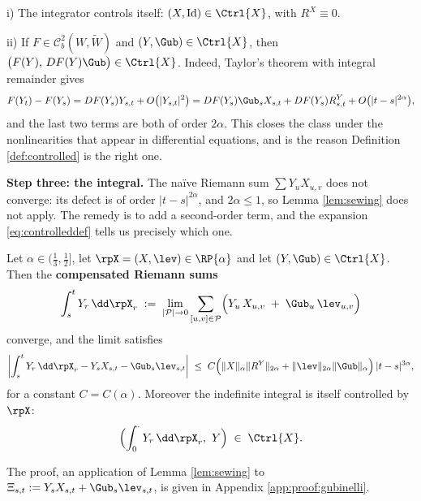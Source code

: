 \begin{example}\label{ex:controlledexamples}
i) The integrator controls itself: $(X, \mathrm{Id}) \in \Ctrl{X}$, with $R^X \equiv 0$.

ii) If $F \in \mathcal{C}^2_b(W,\widetilde W)$ and $(Y,\Gub) \in \Ctrl{X}$, then
$\bigl(F(Y),\,DF(Y)\Gub\bigr) \in \Ctrl{X}$. Indeed, Taylor's theorem with integral remainder gives
\[
F(Y_t)-F(Y_s) = DF(Y_s)Y_{s,t} + O\bigl(|Y_{s,t}|^2\bigr)
= DF(Y_s)\Gub_s X_{s,t} + DF(Y_s)R^Y_{s,t} + O\bigl(|t-s|^{2\alpha}\bigr),
\]
and the last two terms are both of order $2\alpha$. This closes the class under the nonlinearities
that appear in differential equations, and is the reason Definition \ref{def:controlled} is the
right one.
\end{example}

\medskip

\noindent\textbf{Step three: the integral.} The naïve Riemann sum $\sum Y_u X_{u,v}$ does not
converge: its defect is of order $|t-s|^{2\alpha}$, and $2\alpha \leq 1$, so Lemma \ref{lem:sewing}
does not apply. The remedy is to add a second-order term, and the expansion \eqref{eq:controlleddef}
tells us precisely which one.

\begin{theorem}[Gubinelli]\label{thm:gubinelli}
Let $\alpha \in (\tfrac13,\tfrac12]$, let $\rpX = (X,\lev)\in\RP{\alpha}$ and let
$(Y,\Gub) \in \Ctrl{X}$. Then the \textbf{compensated Riemann sums}
\begin{equation}\label{eq:roughintegral}
\int_s^t Y_r\,\dd\rpX_r \;:=\; \lim_{|\mathcal{P}|\to0} \sum_{[u,v]\in\mathcal{P}} \Bigl( Y_u\,X_{u,v} \;+\; \Gub_u\,\lev_{u,v} \Bigr)
\end{equation}
converge, and the limit satisfies
\begin{equation}\label{eq:roughintegralestimate}
\biggl| \int_s^t Y_r\,\dd\rpX_r - Y_s X_{s,t} - \Gub_s \lev_{s,t} \biggr|
\;\leq\; C\Bigl( \lVert X\rVert_\alpha \lVert R^Y\rVert_{2\alpha} + \lVert \lev\rVert_{2\alpha}\lVert \Gub\rVert_\alpha \Bigr)\,|t-s|^{3\alpha},
\end{equation}
for a constant $C = C(\alpha)$. Moreover the indefinite integral is itself controlled by $\rpX$:
\begin{equation}\label{eq:integraliscontrolled}
\Bigl( \int_0^{\cdot} Y_r\,\dd\rpX_r,\ Y \Bigr) \;\in\; \Ctrl{X}.
\end{equation}
\end{theorem}

The proof, an application of Lemma \ref{lem:sewing} to
$\Xi_{s,t} := Y_sX_{s,t} + \Gub_s\lev_{s,t}$, is given in Appendix \ref{app:proof:gubinelli}.

